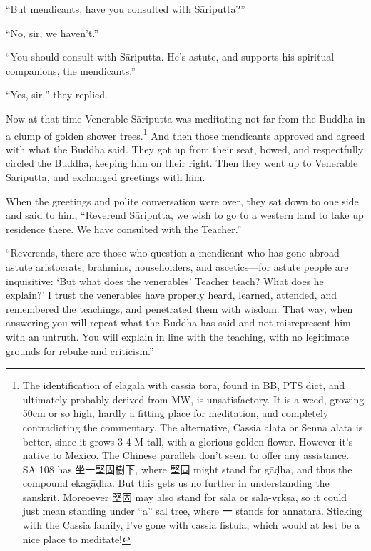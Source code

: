 \documentclass[12pt,openany]{book}%
\begin{document}
“But mendicants, have you consulted with \textsanskrit{Sāriputta}?” 

“No, sir, we haven’t.” 

“You should consult with \textsanskrit{Sāriputta}. He’s astute, and supports his spiritual companions, the mendicants.” 

“Yes, sir,” they replied. 

Now at that time Venerable \textsanskrit{Sāriputta} was meditating not far from the Buddha in a clump of golden shower trees.\footnote{The identification of elagala with cassia tora, found in BB, PTS dict, and ultimately probably derived from MW, is unsatisfactory. It is a weed, growing 50cm or so high, hardly a fitting place for meditation, and completely contradicting the commentary. The alternative, Cassia alata or Senna alata is better, since it grows 3-4 M tall, with a glorious golden flower. However it’s native to Mexico. The Chinese parallels don’t seem to offer any assistance. SA 108 has 坐一堅固樹下, where 堅固 might stand for \textsanskrit{gāḍha}, and thus the compound \textsanskrit{ekagāḍha}. But this gets us no further in understanding the sanskrit. Moreoever 堅固 may also stand for \textsanskrit{sāla} or \textsanskrit{sāla}-\textsanskrit{vṛkṣa}, so it could just mean standing under “a” sal tree, where 一 stands for annatara. Sticking with the Cassia family, I’ve gone with cassia fistula, which would at lest be a nice place to meditate! } And then those mendicants approved and agreed with what the Buddha said. They got up from their seat, bowed, and respectfully circled the Buddha, keeping him on their right. Then they went up to Venerable \textsanskrit{Sāriputta}, and exchanged greetings with him. 

When the greetings and polite conversation were over, they sat down to one side and said to him, “Reverend \textsanskrit{Sāriputta}, we wish to go to a western land to take up residence there. We have consulted with the Teacher.” 

“Reverends, there are those who question a mendicant who has gone abroad—astute aristocrats, brahmins, householders, and ascetics—for astute people are inquisitive: ‘But what does the venerables’ Teacher teach? What does he explain?’ I trust the venerables have properly heard, learned, attended, and remembered the teachings, and penetrated them with wisdom. That way, when answering you will repeat what the Buddha has said and not misrepresent him with an untruth. You will explain in line with the teaching, with no legitimate grounds for rebuke and criticism.” 
\end{document}
